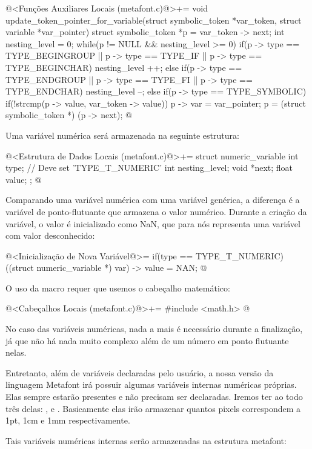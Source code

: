 \iniciocodigo
@<Funções Auxiliares Locais (metafont.c)@>+=
void update_token_pointer_for_variable(struct symbolic_token *var_token,
                                      struct variable *var_pointer){
  struct symbolic_token *p = var_token -> next;
  int nesting_level = 0;
  while(p != NULL && nesting_level >= 0){
    if(p -> type == TYPE_BEGINGROUP || p -> type == TYPE_IF ||
       p -> type == TYPE_BEGINCHAR)
      nesting_level ++;
    else if(p -> type == TYPE_ENDGROUP || p -> type == TYPE_FI ||
            p -> type == TYPE_ENDCHAR)
      nesting_level --;
    else if(p -> type == TYPE_SYMBOLIC){
      if(!strcmp(p -> value, var_token -> value)){
        p -> var = var_pointer;
      }
    }
    p = (struct symbolic_token *) (p -> next);
  }
}
@
\fimcodigo


Uma variável numérica será armazenada na seguinte estrutura:

\iniciocodigo
@<Estrutura de Dados Locais (metafont.c)@>+=
struct numeric_variable{
  int type; // Deve set 'TYPE_T_NUMERIC'
  int nesting_level;
  void *next;
  float value;
};
@
\fimcodigo

Comparando uma variável numérica com uma variável genérica, a
diferença é a variável de ponto-flutuante  que
armazena o valor numérico. Durante a criação da variável, o valor é
inicializado como NaN, que para nós representa uma variável com valor
desconhecido:

\iniciocodigo
@<Inicialização de Nova Variável@>=
if(type == TYPE_T_NUMERIC){
  ((struct numeric_variable *) var) -> value = NAN;
}
@
\fimcodigo

O uso da macro  requer que usemos o cabeçalho
matemático:

\iniciocodigo
@<Cabeçalhos Locais (metafont.c)@>+=
#include <math.h>
@
\fimcodigo

No caso das variáveis numéricas, nada a mais é necessário durante a
finalização, já que não há nada muito complexo além de um número em
ponto flutuante nelas.

Entretanto, além de variáveis declaradas pelo usuário, a nossa versão
da linguagem Metafont irá possuir algumas variáveis internas numéricas
próprias. Elas sempre estarão presentes e não precisam ser
declaradas. Iremos ter ao todo três
delas: ,  e . Basicamente
elas irão armazenar quantos pixels correspondem a 1pt, 1cm e 1mm
respectivamente.

Tais variáveis numéricas internas serão armazenadas na estrutura
metafont:

